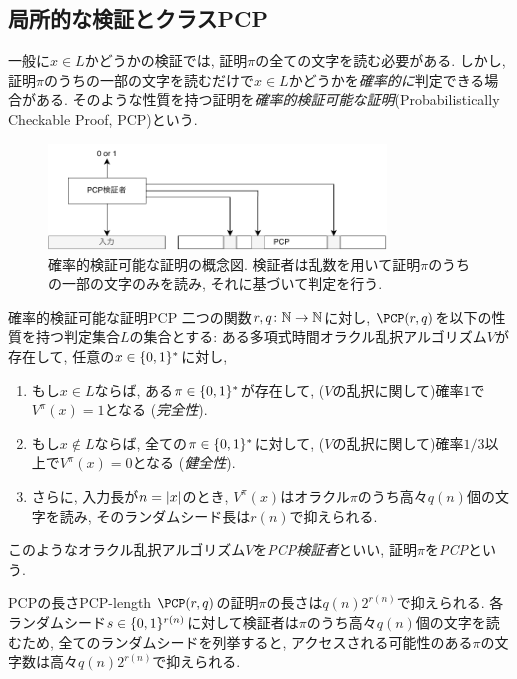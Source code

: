 \subsection{局所的な検証とクラスPCP} \label{sec:PCP}

一般に$x\in L$かどうかの検証では, 証明$\pi$の全ての文字を読む必要がある.
しかし, 証明$\pi$のうちの一部の文字を読むだけで$x\in L$かどうかを\emph{確率的に}判定できる場合がある.
そのような性質を持つ証明を\emph{確率的検証可能な証明}(Probabilistically Checkable Proof, PCP)という.

\begin{figure}[htbp]
  \centering
  \includegraphics[width=0.8\textwidth]{images/PCPverifier.drawio.pdf}
  \caption{確率的検証可能な証明の概念図. 検証者は乱数を用いて証明$\pi$のうちの一部の文字のみを読み, それに基づいて判定を行う.}
  \label{fig:pcpverifier}
\end{figure}


\begin{definition}{確率的検証可能な証明}{PCP}
  二つの関数$r,q\colon\mathbb{N}\to\mathbb{N}$に対し, $\PCP(r,q)$を以下の性質を持つ判定集合$L$の集合とする: ある多項式時間オラクル乱択アルゴリズム$V$が存在して, 任意の$x\in\{0,1\}^*$に対し,
  \begin{enumerate}
  \item もし$x\in L$ならば, ある$\pi\in\{0,1\}^*$が存在して, ($V$の乱択に関して)確率$1$で$V^\pi(x)=1$となる (\emph{完全性}).
  \item もし$x\notin L$ならば, 全ての$\pi\in\{0,1\}^*$に対して, ($V$の乱択に関して)確率$1/3$以上で$V^\pi(x)=0$となる (\emph{健全性}).
  \item さらに, 入力長が$n=\abs{x}$のとき, $V^\pi(x)$はオラクル$\pi$のうち高々$q(n)$個の文字を読み, そのランダムシード長は$r(n)$で抑えられる.
  \end{enumerate}
  このようなオラクル乱択アルゴリズム$V$を\emph{PCP検証者}といい, 証明$\pi$を\emph{PCP}という.
\end{definition}
\begin{remark}{PCPの長さ}{PCP-length}
  $\PCP(r,q)$の証明$\pi$の長さは$q(n)2^{r(n)}$で抑えられる.
  各ランダムシード$s \in \{0,1\}^{r(n)}$に対して検証者は$\pi$のうち高々$q(n)$個の文字を読むため, 全てのランダムシードを列挙すると, アクセスされる可能性のある$\pi$の文字数は高々$q(n)2^{r(n)}$で抑えられる.
\end{remark}

